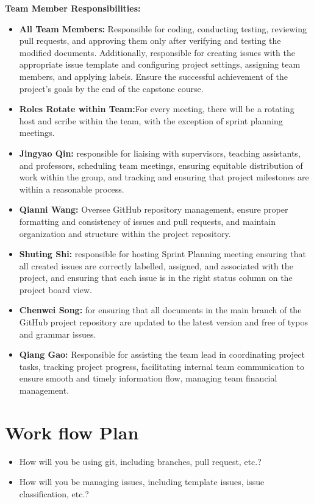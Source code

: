 \documentclass{article}
\begin{document}
\textbf{	Team Member Responsibilities:}
\begin{itemize}
	\item \textbf{All Team Members:} Responsible for coding, conducting testing, reviewing pull requests, and approving them only after verifying and testing the modified documents. Additionally, responsible for creating issues with the appropriate issue template and configuring project settings, assigning team members, and applying labels. Ensure the successful achievement of the project's goals by the end of the capstone course.
	\item \textbf{Roles Rotate within Team:}For every meeting, there will be a rotating host and scribe within the team, with the exception of sprint planning meetings.
    \item \textbf{Jingyao Qin:} responsible for liaising with supervisors, teaching assistants, and professors, scheduling team meetings, ensuring equitable distribution of work within the group, and tracking and ensuring that project milestones are within a reasonable process.
    \item \textbf{Qianni Wang:} Oversee GitHub repository management, ensure proper formatting and consistency of issues and pull requests, and maintain organization and structure within the project repository.
    \item \textbf{Shuting Shi:} responsible for hosting  Sprint Planning meeting ensuring that all created issues are correctly labelled, assigned, and associated with the project, and ensuring that each issue is in the right status column on the project board view.
    \item \textbf{Chenwei Song:} for ensuring that all documents in the main branch of the GitHub project repository are updated to the latest version and free of typos and grammar issues.
    \item \textbf{Qiang Gao:} Responsible for assisting the team lead in coordinating project tasks, tracking project progress, facilitating internal team communication to ensure smooth and timely information flow, managing team financial management.
    
\end{itemize}



\section{Work flow Plan}

\begin{itemize}
	\item How will you be using git, including branches, pull request, etc.?
	\item How will you be managing issues, including template issues, issue
	classification, etc.?
\end{itemize}
\end{document}
